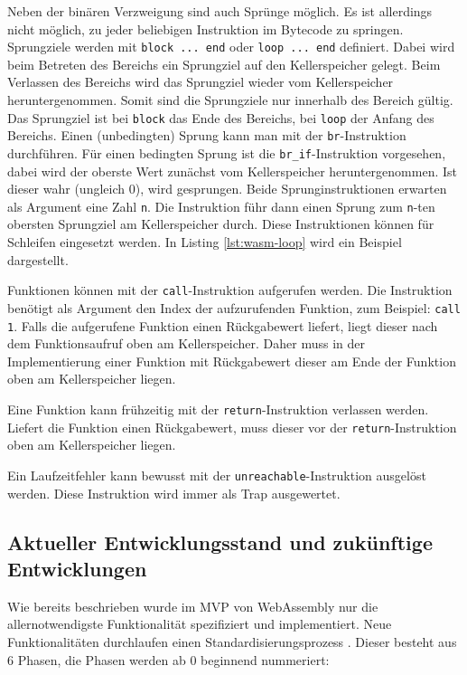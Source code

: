 Neben der binären Verzweigung sind auch Sprünge möglich. Es ist allerdings nicht möglich, zu jeder beliebigen Instruktion im Bytecode zu springen. Sprungziele werden mit \lstinline{block ... end} oder \lstinline{loop ... end} definiert. Dabei wird beim Betreten des Bereichs ein Sprungziel auf den Kellerspeicher gelegt. Beim Verlassen des Bereichs wird das Sprungziel wieder vom Kellerspeicher heruntergenommen. Somit sind die Sprungziele nur innerhalb des Bereich gültig. Das Sprungziel ist bei \lstinline{block} das Ende des Bereichs, bei \lstinline{loop} der Anfang des Bereichs. Einen (unbedingten) Sprung kann man mit der \lstinline{br}-Instruktion durchführen. Für einen bedingten Sprung ist die \lstinline{br_if}-Instruktion vorgesehen, dabei wird der oberste Wert zunächst vom Kellerspeicher heruntergenommen. Ist dieser wahr (ungleich 0), wird gesprungen. Beide Sprunginstruktionen erwarten als Argument eine Zahl \lstinline{n}. Die Instruktion führ dann einen Sprung zum \lstinline{n}-ten obersten Sprungziel am Kellerspeicher durch. Diese Instruktionen können für Schleifen eingesetzt werden. In Listing \ref{lst:wasm-loop} wird ein Beispiel dargestellt.



Funktionen können mit der \lstinline{call}-Instruktion aufgerufen werden. Die Instruktion benötigt als Argument den Index der aufzurufenden Funktion, zum Beispiel: \lstinline{call 1}. Falls die aufgerufene Funktion einen Rückgabewert liefert, liegt dieser nach dem Funktionsaufruf oben am Kellerspeicher. Daher muss in der Implementierung einer Funktion mit Rückgabewert dieser am Ende der Funktion oben am Kellerspeicher liegen.

Eine Funktion kann frühzeitig mit der \lstinline{return}-Instruktion verlassen werden. Liefert die Funktion einen Rückgabewert, muss dieser vor der \lstinline{return}-Instruktion oben am Kellerspeicher liegen.

Ein Laufzeitfehler kann bewusst mit der \lstinline{unreachable}-Instruktion ausgelöst werden. Diese Instruktion wird immer als Trap ausgewertet.

\subsection{Aktueller Entwicklungsstand und zukünftige Entwicklungen}
Wie bereits beschrieben wurde im MVP von WebAssembly nur die allernotwendigste Funktionalität spezifiziert und implementiert. Neue Funktionalitäten durchlaufen einen Standardisierungsprozess \cite{WebAssemblyW3CProcess}. Dieser besteht aus 6 Phasen, die Phasen werden ab 0 beginnend nummeriert:

